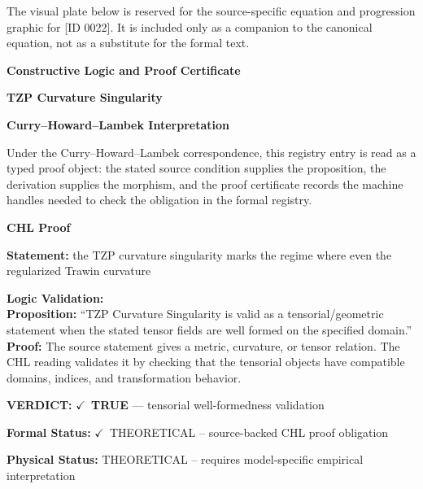 \begingroup\footnotesize\sloppy
The visual plate below is reserved for the source-specific equation and progression graphic for [ID 0022]. It is included only as a companion to the canonical equation, not as a substitute for the formal text.
\par\endgroup
\ifTZPDarkEdition
{}
\fi

\clearpage
\begingroup\tzpsupportsetup
\noindent\textbf{\fontsize{10.8pt}{12.8pt}\selectfont [ID 0022] Constructive Logic and Proof Certificate}\par
\noindent\textbf{\fontsize{10pt}{12pt}\selectfont TZP Curvature Singularity}\par
\vspace{0.45em}
\begingroup
\footnotesize
\setlength{\parskip}{0.22em}
\setlength{\parindent}{0pt}
\noindent\textbf{Curry--Howard--Lambek Interpretation}\par
Under the Curry--Howard--Lambek correspondence, this registry entry is read as a typed proof
object: the stated source condition supplies the proposition, the derivation supplies the
morphism, and the proof certificate records the machine handles needed to check the obligation
in the formal registry.

\vspace{0.45em}
\noindent\textbf{CHL Proof}\par
\textbf{Statement:} the TZP curvature singularity marks the regime where even the regularized Trawin
curvature

\textbf{Logic Validation:}\\
\textbf{Proposition:} ``TZP Curvature Singularity is valid as a tensorial/geometric statement when the stated
tensor fields are well formed on the specified domain.''\\
\textbf{Proof:} The source statement gives a metric, curvature, or tensor relation. The CHL reading
validates it by checking that the tensorial objects have compatible domains, indices,
and transformation behavior.

\textbf{VERDICT:} \ensuremath{\checkmark}\ \textbf{TRUE} --- tensorial well-formedness validation

\textbf{Formal Status:} \ensuremath{\checkmark}\ THEORETICAL -- source-backed CHL proof obligation

\textbf{Physical Status:} THEORETICAL -- requires model-specific empirical interpretation
\par\vspace{0.45em}
\par
\ifTZPDarkEdition
{}
\fi
\endgroup
\endgroup
